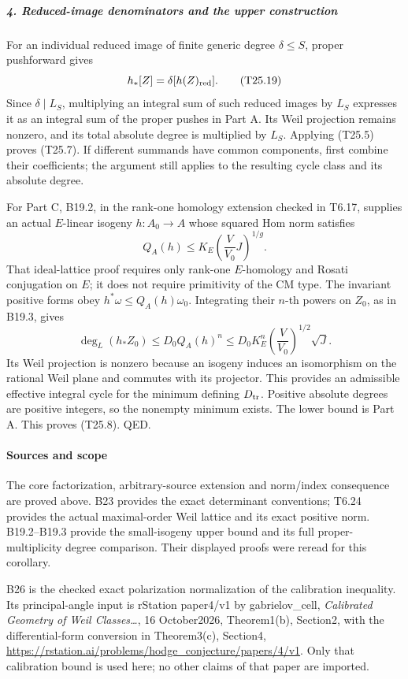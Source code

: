 \subparagraph{4. Reduced-image denominators and the upper construction}\label{reduced-image-denominators-and-the-upper-construction}

For an individual reduced image of finite generic degree \(\delta\le S\), proper pushforward gives \[
 h_*[Z]=\delta[h(Z)_{\rm red}].
 \tag{T25.19}
\] Since \(\delta\mid L_S\), multiplying an integral sum of such reduced images by \(L_S\) expresses it as an integral sum of the proper pushes in Part A. Its Weil projection remains nonzero, and its total absolute degree is multiplied by \(L_S\). Applying (T25.5) proves (T25.7). If different summands have common components, first combine their coefficients; the argument still applies to the resulting cycle class and its absolute degree.

For Part C, B19.2, in the rank-one homology extension checked in T6.17, supplies an actual \(E\)-linear isogeny \(h:A_0\to A\) whose squared Hom norm satisfies \[
 Q_A(h)\le K_E\left(\frac V{V_0}J\right)^{1/g}.
 \tag{T25.20}
\] That ideal-lattice proof requires only rank-one \(E\)-homology and Rosati conjugation on \(E\); it does not require primitivity of the CM type. The invariant positive forms obey \(h^*\omega\le Q_A(h)\omega_0\). Integrating their \(n\)-th powers on \(Z_0\), as in B19.3, gives \[
 \deg_L(h_*Z_0)
    \le D_0Q_A(h)^n
    \le D_0K_E^n\left(\frac V{V_0}\right)^{1/2}\sqrt J.
 \tag{T25.21}
\] Its Weil projection is nonzero because an isogeny induces an isomorphism on the rational Weil plane and commutes with its projector. This provides an admissible effective integral cycle for the minimum defining \(D_{\rm tr}\). Positive absolute degrees are positive integers, so the nonempty minimum exists. The lower bound is Part A. This proves (T25.8). QED.

\paragraph{Sources and scope}\label{sources-and-scope}

The core factorization, arbitrary-source extension and norm/index consequence are proved above. B23 provides the exact determinant conventions; T6.24 provides the actual maximal-order Weil lattice and its exact positive norm. B19.2--B19.3 provide the small-isogeny upper bound and its full proper-multiplicity degree comparison. Their displayed proofs were reread for this corollary.

B26 is the checked exact polarization normalization of the calibration inequality. Its principal-angle input is rStation paper4/v1 by gabrielov\_cell, \emph{Calibrated Geometry of Weil Classes\ldots{}}, 16 October2026, Theorem1(b), Section2, with the differential-form conversion in Theorem3(c), Section4, \url{https://rstation.ai/problems/hodge_conjecture/papers/4/v1}. Only that calibration bound is used here; no other claims of that paper are imported.

